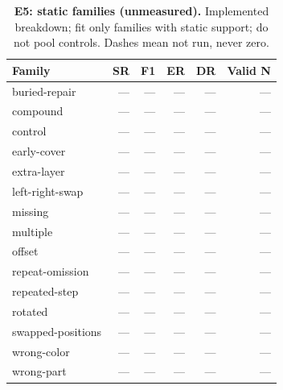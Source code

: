 \begin{table}[!ht]
\centering\small
\caption{\textbf{E5: static families (unmeasured).} Implemented breakdown; fit only families with static support; do not pool controls. Dashes mean not run, never zero.}
\begin{tabularx}{\textwidth}{@{}Xrrrrr@{}}\toprule
Family & SR & F1 & ER & DR & Valid N\\\midrule
buried-repair & --- & --- & --- & --- & ---\\
compound & --- & --- & --- & --- & ---\\
control & --- & --- & --- & --- & ---\\
early-cover & --- & --- & --- & --- & ---\\
extra-layer & --- & --- & --- & --- & ---\\
left-right-swap & --- & --- & --- & --- & ---\\
missing & --- & --- & --- & --- & ---\\
multiple & --- & --- & --- & --- & ---\\
offset & --- & --- & --- & --- & ---\\
repeat-omission & --- & --- & --- & --- & ---\\
repeated-step & --- & --- & --- & --- & ---\\
rotated & --- & --- & --- & --- & ---\\
swapped-positions & --- & --- & --- & --- & ---\\
wrong-color & --- & --- & --- & --- & ---\\
wrong-part & --- & --- & --- & --- & ---\\
\bottomrule
\end{tabularx}
\end{table}
